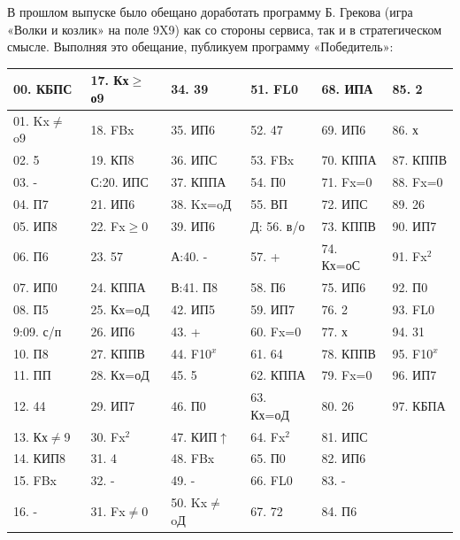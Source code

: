 \documentclass[11pt,a4paper,oneside]{article}
\begin{document}
В прошлом выпуске было обещано доработать программу Б. Грекова (игра «Волки и козлик» на поле 9X9) как со стороны сервиса, так и в стратегическом смысле. Выполняя это обещание, публикуем программу «Победитель»:

\begin{table}[]
\begin{tabular}{|l|l|l|l|l|l|}
\hline
00. КБПС  & 17. Кх$\geq$о9 & 34. 39    & 51. FL0    & 68. ИПА   & 85. 2    \\ \hline
01. Kx$\neq$o9 & 18. FBx   & 35. ИП6   & 52. 47     & 69. ИП6   & 86. х    \\ \hline
02. 5     & 19. КП8   & 36. ИПС   & 53. FBx    & 70. КППА  & 87. КППВ \\ \hline
03. -     & С:20. ИПС & 37. КППА  & 54. П0     & 71. Fx=0  & 88. Fx=0 \\ \hline
04. П7    & 21. ИП6   & 38. Kx=oД & 55. ВП     & 72. ИПС   & 89. 26   \\ \hline
05. ИП8   & 22. Fx$\geq$0  & 39. ИП6   & Д: 56. в/о & 73. КППВ  & 90. ИП7  \\ \hline
06. П6    & 23. 57    & А:40. -   & 57. +      & 74. Кх=оС & 91. Fx$^{2}$  \\ \hline
07. ИП0   & 24. КППА  & В:41. П8  & 58. П6     & 75. ИП6   & 92. П0   \\ \hline
08. П5    & 25. Кх=оД & 42. ИП5   & 59. ИП7    & 76. 2     & 93. FL0  \\ \hline
9:09. с/п & 26. ИП6   & 43. +     & 60. Fx=0   & 77. х     & 94. 31   \\ \hline
10. П8    & 27. КППВ  & 44. F10$^{x}$  & 61. 64     & 78. КППВ  & 95. F10$^{x}$ \\ \hline
11. ПП    & 28. Кх=оД & 45. 5     & 62. КППА   & 79. Fx=0  & 96. ИП7  \\ \hline
12. 44    & 29. ИП7   & 46. П0    & 63. Кх=оД  & 80. 26    & 97. КБПА \\ \hline
13. Кх$\neq$9  & 30. Fx$^{2}$   & 47. КИП$\uparrow$  & 64. Fx$^{2}$    & 81. ИПС   &          \\ \hline
14. КИП8  & 31. 4     & 48. FBx   & 65. П0     & 82. ИП6   &          \\ \hline
15. FBx   & 32. -     & 49. -     & 66. FL0    & 83. -     &          \\ \hline
16. -     & 31. Fx$\neq$0  & 50. Kx$\neq$oД & 67. 72     & 84. П6    &          \\ \hline
\end{tabular}
\end{table}
\end{document}
